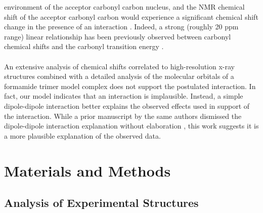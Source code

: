 \begin{doublespace}
environment of the acceptor carbonyl carbon nucleus, and the NMR \cnmr{}
chemical shift of the acceptor carbonyl carbon would experience a significant
chemical shift change in the presence of an \npistar{} interaction
\cite{abragam1961}. Indeed, a strong (roughly 20 ppm range) linear
relationship has been previously observed between carbonyl \cnmr{} chemical
shifts and the carbonyl \npistar{} transition energy
\cite{savitzky:anchem1964,de:mphys1970}.
\\\\
An extensive analysis of \cnmr{} chemical shifts correlated to high-resolution
x-ray structures combined with a detailed analysis of the molecular orbitals of
a formamide trimer model complex does not support the postulated \npistar{}
interaction. In fact, our model indicates that an \npistar{} interaction is
implausible. Instead, a simple dipole-dipole interaction better explains the
observed effects used in support of the \npistar{} interaction. While a prior
manuscript by the same authors dismissed the dipole-dipole interaction
explanation without elaboration \cite{choudhary:jacs2009}, this
work suggests it is a more plausible explanation of the observed data.
\end{doublespace}

\section{Materials and Methods}

\subsection{Analysis of Experimental Structures}

